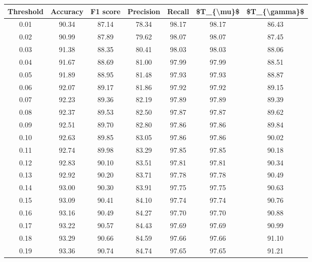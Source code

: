 \begin{tabular}{|c|c|c|c|c|c|c|}
\hline
 Threshold &  Accuracy &  F1 score &  Precision &  Recall &  \$T\_\{\textbackslash mu\}\$ &  \$T\_\{\textbackslash gamma\}\$ \\
\hline
      0.01 &     90.34 &     87.14 &      78.34 &   98.17 &      98.17 &         86.43 \\
      0.02 &     90.99 &     87.89 &      79.62 &   98.07 &      98.07 &         87.45 \\
      0.03 &     91.38 &     88.35 &      80.41 &   98.03 &      98.03 &         88.06 \\
      0.04 &     91.67 &     88.69 &      81.00 &   97.99 &      97.99 &         88.51 \\
      0.05 &     91.89 &     88.95 &      81.48 &   97.93 &      97.93 &         88.87 \\
      0.06 &     92.07 &     89.17 &      81.86 &   97.92 &      97.92 &         89.15 \\
      0.07 &     92.23 &     89.36 &      82.19 &   97.89 &      97.89 &         89.39 \\
      0.08 &     92.37 &     89.53 &      82.50 &   97.87 &      97.87 &         89.62 \\
      0.09 &     92.51 &     89.70 &      82.80 &   97.86 &      97.86 &         89.84 \\
      0.10 &     92.63 &     89.85 &      83.05 &   97.86 &      97.86 &         90.02 \\
      0.11 &     92.74 &     89.98 &      83.29 &   97.85 &      97.85 &         90.18 \\
      0.12 &     92.83 &     90.10 &      83.51 &   97.81 &      97.81 &         90.34 \\
      0.13 &     92.92 &     90.20 &      83.71 &   97.78 &      97.78 &         90.49 \\
      0.14 &     93.00 &     90.30 &      83.91 &   97.75 &      97.75 &         90.63 \\
      0.15 &     93.09 &     90.41 &      84.10 &   97.74 &      97.74 &         90.76 \\
      0.16 &     93.16 &     90.49 &      84.27 &   97.70 &      97.70 &         90.88 \\
      0.17 &     93.22 &     90.57 &      84.43 &   97.69 &      97.69 &         90.99 \\
      0.18 &     93.29 &     90.66 &      84.59 &   97.66 &      97.66 &         91.10 \\
      0.19 &     93.36 &     90.74 &      84.74 &   97.65 &      97.65 &         91.21 \\

\end{tabular}
